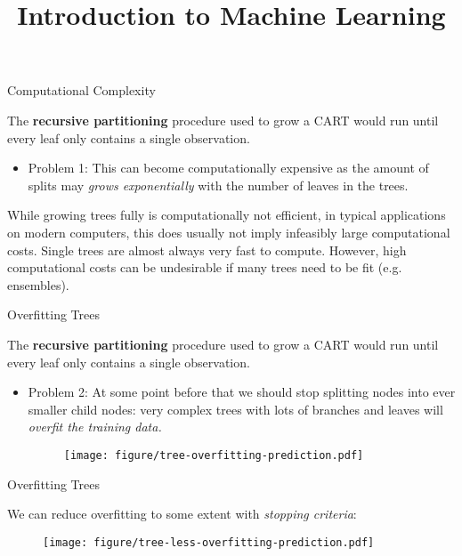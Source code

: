 \documentclass[11pt,compress,t,notes=noshow, xcolor=table]{beamer}
\title{Introduction to Machine Learning}
\institute{\href{https://compstat-lmu.github.io/lecture_i2ml/}{compstat-lmu.github.io/lecture\_i2ml}}
\date{}
\begin{document}
\sloppy

\begin{vbframe}{Computational Complexity}

The \textbf{recursive partitioning} procedure used to grow a CART would run until every leaf only contains a single observation. 
\begin{itemize}
\item Problem 1: This can become computationally expensive as the amount of splits may \emph{grows exponentially} with the number of leaves in the trees.
\end{itemize}

While growing trees fully is computationally not efficient, in typical applications on modern computers, this does usually not imply infeasibly large computational costs.
Single trees are almost always very fast to compute.
However, high computational costs can be undesirable if many trees need to be fit (e.g. ensembles).

\end{vbframe}

\begin{vbframe}{Overfitting Trees}

The \textbf{recursive partitioning} procedure used to grow a CART would run until every leaf only contains a single observation. 
\begin{itemize}
\item Problem 2: At some point before that we should stop splitting nodes into ever smaller child nodes: very complex trees with lots of branches and leaves will \emph{overfit the training data.}

\begin{figure}
\centering
\texttt{[image: figure/tree-overfitting-prediction.pdf]}
\end{figure}

\end{itemize}

\end{vbframe}

\begin{vbframe}{Overfitting Trees}

We can reduce overfitting to some extent with \emph{stopping criteria}:
\vspace{0.25cm}

\begin{figure}
\centering
\texttt{[image: figure/tree-less-overfitting-prediction.pdf]}
\end{figure}

\end{vbframe}
\end{document}
